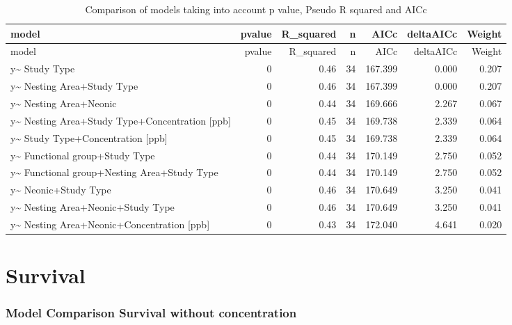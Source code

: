 \documentclass[]{elsarticle} %
\begin{document}
\begin{longtable}[c]{@{}lrrrrrr@{}}
\caption{Comparison of models taking into account p value, Pseudo R
squared and AICc}\tabularnewline
\toprule
model & pvalue & R\_squared & n & AICc & deltaAICc &
Weight\tabularnewline
\midrule
\endfirsthead
\toprule
model & pvalue & R\_squared & n & AICc & deltaAICc &
Weight\tabularnewline
\midrule
\endhead
y\textasciitilde{} Study Type & 0 & 0.46 & 34 & 167.399 & 0.000 &
0.207\tabularnewline
y\textasciitilde{} Nesting Area+Study Type & 0 & 0.46 & 34 & 167.399 &
0.000 & 0.207\tabularnewline
y\textasciitilde{} Nesting Area+Neonic & 0 & 0.44 & 34 & 169.666 & 2.267
& 0.067\tabularnewline
y\textasciitilde{} Nesting Area+Study Type+Concentration {[}ppb{]} & 0 &
0.45 & 34 & 169.738 & 2.339 & 0.064\tabularnewline
y\textasciitilde{} Study Type+Concentration {[}ppb{]} & 0 & 0.45 & 34 &
169.738 & 2.339 & 0.064\tabularnewline
y\textasciitilde{} Functional group+Study Type & 0 & 0.44 & 34 & 170.149
& 2.750 & 0.052\tabularnewline
y\textasciitilde{} Functional group+Nesting Area+Study Type & 0 & 0.44 &
34 & 170.149 & 2.750 & 0.052\tabularnewline
y\textasciitilde{} Neonic+Study Type & 0 & 0.46 & 34 & 170.649 & 3.250 &
0.041\tabularnewline
y\textasciitilde{} Nesting Area+Neonic+Study Type & 0 & 0.46 & 34 &
170.649 & 3.250 & 0.041\tabularnewline
y\textasciitilde{} Nesting Area+Neonic+Concentration {[}ppb{]} & 0 &
0.43 & 34 & 172.040 & 4.641 & 0.020\tabularnewline
\bottomrule
\end{longtable}

\section{Survival}\label{survival}

\subsubsection{Model Comparison Survival without
concentration}\label{model-comparison-survival-without-concentration}
\end{document}

